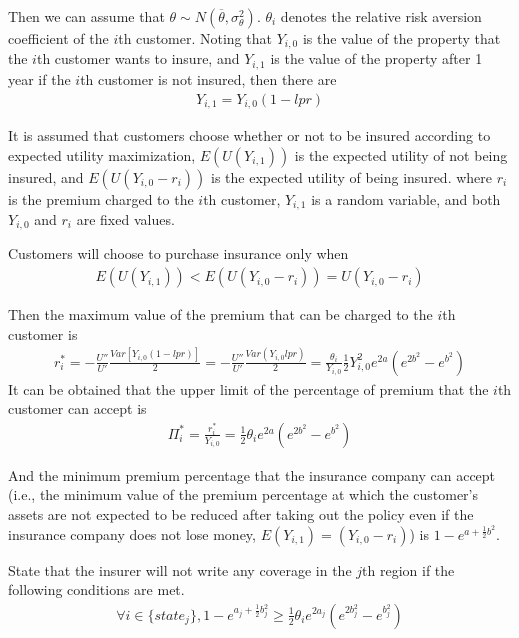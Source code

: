 \documentclass[12pt]{article}  %
\begin{document}
Then we can assume that $\theta  \sim N( \overline{\theta},\sigma^2_{\theta} )$. $\theta_i$ denotes the relative risk aversion coefficient of the $i$th customer. Noting that $Y_{i,0}$ is the value of the property that the $i$th customer wants to insure, and $Y_{i,1}$ is the value of the property after 1 year if the $i$th customer is not insured, then there are
\begin{align*}
    Y_{i,1}=Y_{i,0}(1-lpr)
\end{align*}

It is assumed that customers choose whether or not to be insured according to expected utility maximization, $E(U(Y_{i,1}))$ is the expected utility of not being insured, and $E(U(Y_{i,0}-r_{i}))$ is the expected utility of being insured. where $r_i$ is the premium charged to the $i$th customer, $Y_{i,1}$ is a random variable, and both $Y_{i,0}$ and $r_i$ are fixed values.

Customers will choose to purchase insurance only when 
\begin{align*}
    E(U(Y_{i,1}))<E(U(Y_{i,0}-r_{i}))=U(Y_{i,0}-r_{i})
\end{align*}

Then the maximum value of the premium that can be charged to the $i$th customer is
\begin{align*}
    r_i^*=- \frac{U''}{U'} \frac{Var[Y_{i,0}(1-lpr)]}{2} 
=- \frac{U''}{U'} \frac{Var(Y_{i,0}lpr)}{2} 
= \frac{\theta_i}{Y_{i,0}} \frac{1}{2}Y_{i,0}^2e^{2a}(e^{2b^2}-e^{b^2})
\end{align*}
It can be obtained that the upper limit of the percentage of premium that the $i$th customer can accept is
\begin{align*}
    \Pi_i^*=\frac{r^*_i}{Y_{i,0}}= \frac{1}{2}\theta_ie^{2a}(e^{2b^2}-e^{b^2}) 
\end{align*}

And the minimum premium percentage that the insurance company can accept (i.e., the minimum value of the premium percentage at which the customer's assets are not expected to be reduced after taking out the policy even if the insurance company does not lose money, $E(Y_{i,1})=(Y_{i,0}-r_{i})$) is $1-e^{a+ \frac{1}{2}b^2 }$.

State that the insurer will not write any coverage in the $j$th region if the following conditions are met.
\begin{align*}
    {\forall}i\in\{state_j\},1-e^{a_j+ \frac{1}{2}b_j^2 } \geq  \frac{1}{2}\theta_ie^{2a_j}(e^{2b_j^2}-e^{b_j^2})
\end{align*}
\end{document}
